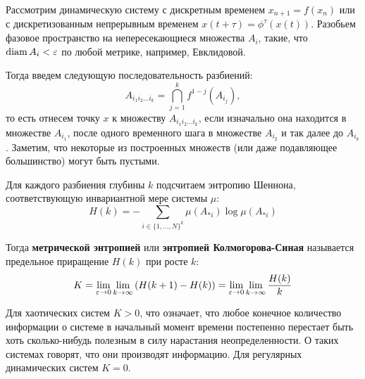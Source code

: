 
\begin{definition}
    Рассмотрим динамическую систему с дискретным временем $x_{n+1} = f(x_n)$ или с дискретизованным непрерывным временем $x(t+\tau) = \phi^\tau(x(t))$.
    Разобьем фазовое пространство на непересекающиеся множества $A_i$, такие, что $\operatorname{diam} A_i < \varepsilon$ по любой метрике, например, Евклидовой.
    
    Тогда введем следующую последовательность разбиений:
    \begin{equation*}
        A_{i_1 i_2 \dots i_k} = \bigcap_{j=1}^{k} f^{1-j}\left( A_{i_j} \right),
    \end{equation*}
    то есть отнесем точку $x$ к множеству $A_{i_1 i_2 \dots i_k}$, если изначально она находится в множестве $A_{i_1}$, после одного временного шага в множестве $A_{i_2}$ и так далее до $A_{i_k}$.
    Заметим, что некоторые из построенных множеств (или даже подавляющее большинство) могут быть пустыми.
    
    Для каждого разбиения глубины $k$ подсчитаем энтропию Шеннона, соответствующую инвариантной мере системы $\mu$:
    \begin{equation*}
        H\left( k \right) = - \sum_{i \in \{1,\dots,N\}^k} \mu\left( A_{*i} \right) \log \mu\left( A_{*i} \right)
    \end{equation*}
    
    Тогда \textbf{метрической энтропией} или \textbf{энтропией Колмогорова-Синая} называется предельное приращение $H(k)$ при росте $k$:
    \begin{equation*}
        K =
        \lim_{\varepsilon \to 0} \lim_{k \to \infty} \left( H(k+1) - H(k) \right) =
        \lim_{\varepsilon \to 0} \lim_{k \to \infty} \frac{H(k)}{k}
    \end{equation*}
\end{definition}

Для хаотических систем $K > 0$, что означает, что любое конечное количество информации о системе в начальный момент времени постепенно перестает быть хоть сколько-нибудь полезным в силу нарастания неопределенности. О таких системах говорят, что они производят информацию. Для регулярных динамических систем $K = 0$.

